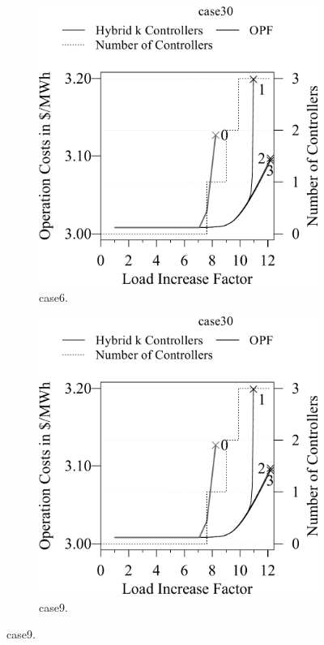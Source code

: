 \begin{figure}[t!]
\vspace{-1.4cm}
  \begin{subfigure}[t]{.45\textwidth}
    \centering
        \includegraphics[width=0.95\linewidth, page=3]{factsplacement/plots/plotCapacityReductionVsCostsController.pdf}
  \caption{case6.}
    \label{ch:appendix:sec:facts:fig:plot-capacity-cost-controller-case6}
\end{subfigure}
\hfill
\begin{subfigure}[t]{.45\textwidth}
    \centering
        \includegraphics[width=0.95\linewidth,
        page=4]{factsplacement/plots/plotCapacityReductionVsCostsController.pdf}
  \caption{case9.}
    \label{ch:appendix:sec:facts:fig:plot-capacity-cost-controller-case9}
\end{subfigure}


\end{figure}
